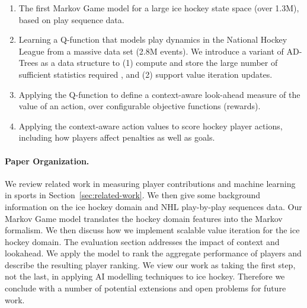 \documentclass[]{article}
\begin{document}
\begin{enumerate}
\item The first Markov Game model for a large ice hockey state space (over 1.3M), based on play sequence data. %
\item Learning a Q-function that models play dynamics in the National Hockey League from a massive data set (2.8M events). We introduce a variant of AD-Trees as a data structure to (1) compute and store the large number of sufficient statistics required \citep{Moore1998}, and (2) support value iteration updates.
\item Applying the Q-function to define a context-aware look-ahead measure of the value of an action, over configurable objective functions (rewards).
\item Applying the context-aware action values to score hockey player actions, including how players affect penalties as well as goals.
\end{enumerate}


\paragraph{Paper Organization.}

We review related work in measuring player contributions and machine learning in sports in Section~\ref{sec:related-work}. We then give some background information on the ice hockey domain and NHL play-by-play sequences data. Our Markov Game model translates the hockey domain features into the Markov formalism. We then discuss how we implement scalable value iteration for the ice hockey domain. The evaluation section addresses the impact of context and lookahead.
We apply the model to rank the aggregate performance of players and describe the resulting player ranking. We view our work as taking the first step, not the last, in applying AI modelling techniques to ice hockey. Therefore we conclude with a number of potential extensions and open problems for future work.
\end{document}
